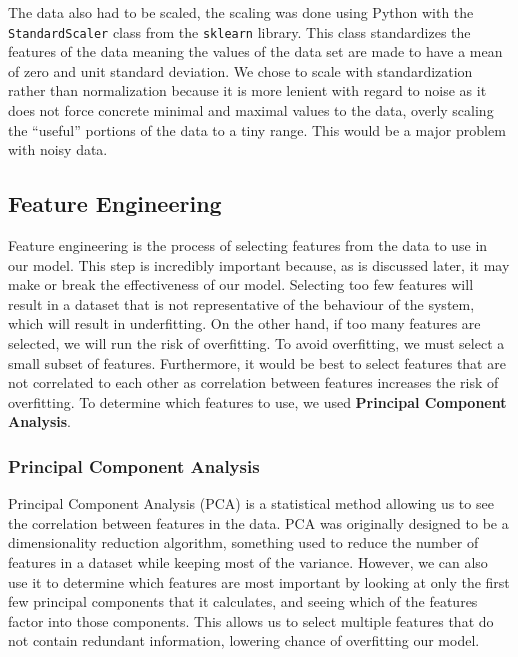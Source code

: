 \documentclass[11pt]{article}
\begin{document}
    The data also had to be scaled, the scaling was done using Python with the
    \texttt{StandardScaler} class from the \texttt{sklearn} library.
    This class standardizes the features of the data meaning the values of the data set are made to
    have a mean of zero and unit standard deviation. 
    We chose to scale with standardization rather than normalization because it is more lenient
    with regard to noise as it does not force concrete minimal and maximal values to the data,
    overly scaling the ``useful'' portions of the data to a tiny range.
    This would be a major problem with noisy data. 

   \subsection{Feature Engineering}
    Feature engineering is the process of selecting features from the data to use in our model.
    This step is incredibly important because, as is discussed later, it may make or break the
    effectiveness of our model.
    Selecting too few features will result in a dataset that is not representative of the
    behaviour of the system, which will result in underfitting.
    On the other hand, if too many features are selected, we will run the risk of overfitting.
    To avoid overfitting, we must select a small subset of features.
    Furthermore, it would be best to select features that are not correlated to each other as
    correlation between features increases the risk of overfitting.
    To determine which features to use, we used \textbf{Principal Component Analysis}.

    \subsubsection{Principal Component Analysis}
    Principal Component Analysis (PCA) is a statistical method allowing us to see the correlation
    between features in the data.
    PCA was originally designed to be a dimensionality reduction algorithm, something used to
    reduce the number of features in a dataset while keeping most of the variance.
    However, we can also use it to determine which features are most important by looking at only
    the first few principal components that it calculates, and seeing which of the features factor
    into those components.
    This allows us to select multiple features that do not contain redundant information, lowering
    chance of overfitting our model.
\end{document}
